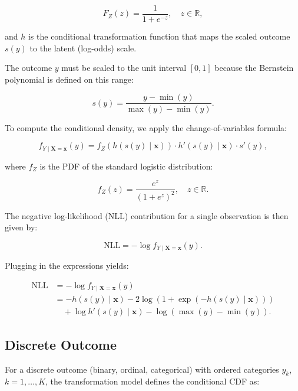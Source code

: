 \begin{equation}
F_Z(z) = \frac{1}{1 + e^{-z}}, \quad z \in \mathbb{R},
\end{equation}

and $h$ is the conditional transformation function that maps the scaled outcome $s(y)$ to the latent (log-odds) scale.

The outcome $y$ must be scaled to the unit interval $[0, 1]$ because the Bernstein polynomial is defined on this range:

\begin{equation}
s(y) = \frac{y - \min(y)}{\max(y) - \min(y)}.
\end{equation}

To compute the conditional density, we apply the change-of-variables formula:

\begin{equation}
f_{Y \mid \mathbf{X} = \mathbf{x}}(y) = f_Z(h(s(y) \mid \mathbf{x})) \cdot h'(s(y) \mid \mathbf{x}) \cdot s'(y),
\end{equation}

where $f_Z$ is the PDF of the standard logistic distribution:

\begin{equation}
f_Z(z) = \frac{e^z}{(1 + e^z)^2}, \quad z \in \mathbb{R}.
\end{equation}

The negative log-likelihood (NLL) contribution for a single observation is then given by:

\begin{equation}
\text{NLL} = - \log f_{Y \mid \mathbf{X} = \mathbf{x}}(y).
\end{equation}

Plugging in the expressions yields:

\begin{align}
\text{NLL} &= - \log f_{Y \mid \mathbf{X} = \mathbf{x}}(y) \nonumber \\
&= -h(s(y) \mid \mathbf{x}) - 2 \log(1 + \exp(-h(s(y) \mid \mathbf{x}))) \nonumber \\
&\quad + \log h'(s(y) \mid \mathbf{x}) - \log(\max(y) - \min(y)).
\end{align}


\subsection{Discrete Outcome}

For a discrete outcome (binary, ordinal, categorical) with ordered categories $y_k$, $k = 1, \ldots, K$, the transformation model defines the conditional CDF as:

